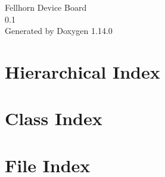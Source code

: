 \documentclass[twoside]{book}
\newcommand{\+}{\discretionary{\mbox{\scriptsize$\hookleftarrow$}}{}{}}
\newcommand{\clearemptydoublepage}{%
    \newpage{\pagestyle{empty}\cleardoublepage}%
  }
\begin{document}
  \raggedbottom
    \hypersetup{pageanchor=false,
                bookmarksnumbered=true,
                pdfencoding=unicode
               }
  \begin{titlepage}
  \vspace*{7cm}
  \begin{center}%
  {\Large Fellhorn Device Board}\\
  [1ex]\large 0.\+1 \\
  \vspace*{1cm}
  {\large Generated by Doxygen 1.14.0}\\
  \end{center}
  \end{titlepage}
  \clearemptydoublepage
  \tableofcontents
  \clearemptydoublepage
  \hypersetup{pageanchor=true}
\chapter{Hierarchical Index}

\chapter{Class Index}

\chapter{File Index}

\end{document}
